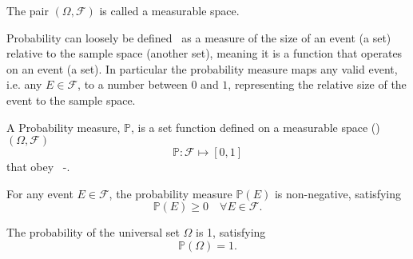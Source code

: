 \begin{definition}
	\label{def:measurable_space}
	The pair \( (\Omega, \mathcal{F}) \) is called a measurable space.
\end{definition}

Probability can loosely be defined~\cite{chan2021introduction} as a measure of the size of an event (a set) relative to the sample space (another set), meaning it is a function that operates on an event (a set). In particular the probability measure maps any valid event, i.e. any $E\in \mathcal{F}$, to a number between $0$ and $1$, representing the relative size of the event to the sample space.

\begin{definition}
	\label{def:probability}
	A Probability measure, $\mathbb{P}$, is a set function  defined on a measurable space () $(\Omega, \mathcal{F})$
	\begin{equation}
		\mathbb{P}: \mathcal{F} \mapsto [0,1]
	\end{equation}
	that obey~\cite{kolmogorov1950foundations} -.
\end{definition}

\begin{axiom}
	\label{ax:non_neg}
	For any event $E\in \mathcal{F}$, the probability measure $\mathbb{P}(E)$ is non-negative, satisfying
	\begin{equation}
		\mathbb{P}(E) \geq 0 \quad \forall E \in  \mathcal{F}.
	\end{equation}
\end{axiom}

\begin{axiom}[Normalization]
	\label{ax:norm}
	The probability of the universal set $\Omega$ is 1, satisfying
	\begin{equation}
		\mathbb{P}(\Omega) = 1.
	\end{equation}
\end{axiom}

